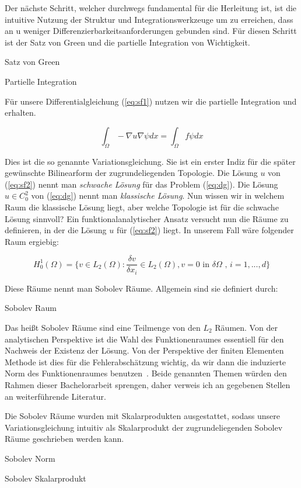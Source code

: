 Der nächste Schritt, welcher durchwegs fundamental für die Herleitung ist, ist die intuitive Nutzung der Struktur und Integrationswerkzeuge um zu erreichen, dass an u weniger Differenzierbarkeitsanforderungen gebunden sind. Für diesen Schritt ist der Satz von Green und die partielle Integration von Wichtigkeit.

\begin{Lemma} Satz von Green
\end{Lemma}

\begin{Lemma} Partielle Integration
\end{Lemma}

Für unsere Differentialgleichung (\ref{eq:sf1}) nutzen wir die partielle Integration und erhalten.

\begin{equation} \label{eq:sf2}
\int_{\Omega} - \nabla u \nabla \psi dx = \int_{\Omega} f \psi dx
\end{equation}
  
Dies ist die so genannte Variationsgleichung. Sie ist ein erster Indiz für die später gewünschte Bilinearform der zugrundeliegenden Topologie.
Die Lösung $u$ von (\ref{eq:sf2}) nennt man \textit{schwache Lösung} für das Problem (\ref{eq:dg}).
Die Lösung $u \in C_{0}^{2}$ von (\ref{eq:dg}) nennt man \textit{klassische Lösung}. Nun wissen wir in welchem Raum die klassische Lösung liegt, aber welche Topologie ist für die schwache Lösung sinnvoll? 
Ein funktionalanalytischer Ansatz versucht nun die Räume zu definieren, in der die Lösung $u$ für (\ref{eq:sf2}) liegt. In unserem Fall wäre folgender Raum ergiebig:

\begin{equation*}
	H_{0}^{1}(\Omega) = \{ v \in L_{2}(\Omega) : \dfrac{\delta v}{\delta x_{i}} \in L_{2}(\Omega), v=0 \text{ in } \delta \Omega \text{ , } i=1,...,d \}
\end{equation*}

Diese Räume nennt man Sobolev Räume. Allgemein sind sie definiert durch:

\begin{Definition} Sobolev Raum
\end{Definition}

Das heißt Sobolev Räume sind eine Teilmenge von den $L_{2}$ Räumen.
Von der analytischen Perspektive ist die Wahl des Funktionenraumes essentiell für den Nachweis der Existenz der Lösung. Von der Perspektive der finiten Elementen Methode ist dies für die Fehlerabschätzung wichtig, da wir dann die induzierte Norm des Funktionenraumes benutzen~\cite[36]{Johnson}. Beide genannten Themen würden den Rahmen dieser Bachelorarbeit sprengen, daher verweis ich an gegebenen Stellen an weiterführende Literatur.

Die Sobolev Räume wurden mit Skalarprodukten ausgestattet, sodass unsere Variationsgleichung intuitiv als Skalarprodukt der zugrundeliegenden Sobolev Räume geschrieben werden kann.

\begin{Lemma} Sobolev Norm
\end{Lemma}

\begin{Lemma} Sobolev Skalarprodukt
\end{Lemma}



